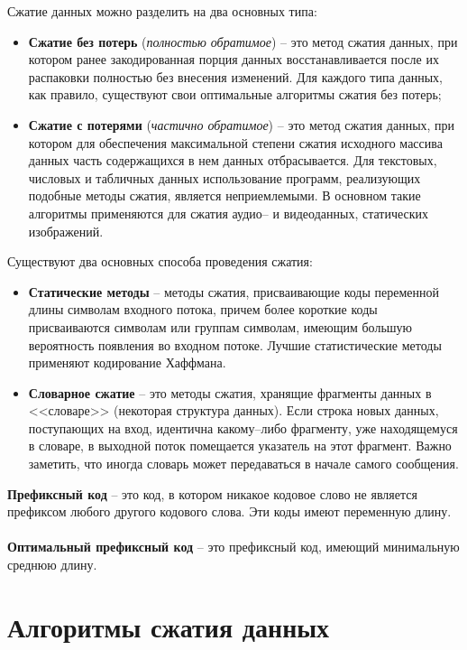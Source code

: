 Сжатие данных можно разделить на два основных типа:
\begin{itemize}
\item \textbf{Сжатие без потерь} (\emph{полностью обратимое}) -- это метод сжатия данных, при котором ранее закодированная порция данных восстанавливается после их распаковки полностью без внесения изменений. Для каждого типа данных, как правило, существуют свои оптимальные алгоритмы сжатия без потерь;
\item \textbf{Сжатие с потерями} (\emph{частично обратимое}) --  это метод сжатия данных, при котором для обеспечения максимальной степени сжатия исходного массива данных часть содержащихся в нем данных отбрасывается. Для текстовых, числовых и табличных данных использование программ, реализующих подобные методы сжатия, является неприемлемыми. В основном такие алгоритмы применяются для сжатия аудио-- и видеоданных, статических изображений.
\end{itemize}
Существуют два основных способа проведения сжатия:
\begin{itemize}
\item \textbf{Статические методы} -- методы сжатия, присваивающие коды переменной длины символам входного потока, причем более короткие коды присваиваются символам или группам символам, имеющим большую вероятность появления во входном потоке. Лучшие статистические методы применяют кодирование Хаффмана.
\item \textbf{Словарное сжатие} -- это методы сжатия, хранящие фрагменты данных в <<словаре>> (некоторая структура данных). Если строка новых данных, поступающих на вход, идентична какому--либо фрагменту, уже находящемуся в словаре, в выходной поток помещается указатель на этот фрагмент. Важно заметить, что иногда словарь может передаваться в начале самого сообщения.
\end{itemize}

\textbf{Префиксный код} -- это код, в котором никакое кодовое слово не является префиксом любого другого кодового слова. Эти коды имеют переменную длину.
\\
\\\textbf{Оптимальный префиксный код} -- это префиксный код, имеющий минимальную среднюю длину.
\\
\newpage
\section{Алгоритмы сжатия данных}
